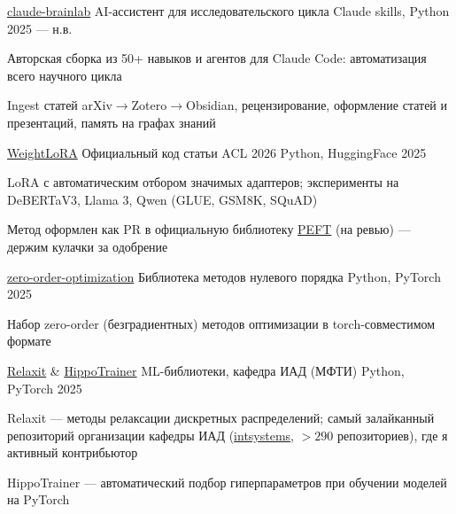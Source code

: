 \begin{cventries}
  \cventry
    {\href{https://github.com/Vepricov/claude-brainlab}{claude-brainlab}} %
    {AI-ассистент для исследовательского цикла} %
    {Claude skills, Python} %
    {2025 — н.в.} %
    {
      \begin{cvitems}
        \item {Авторская сборка из 50+ навыков и агентов для Claude Code: автоматизация всего научного цикла}
        \item {Ingest статей arXiv$\rightarrow$Zotero$\rightarrow$Obsidian, рецензирование, оформление статей и презентаций, память на графах знаний}
      \end{cvitems}
    }

  \cventry
    {\href{https://github.com/Vepricov/WLoRA}{WeightLoRA}} %
    {Официальный код статьи ACL 2026} %
    {Python, HuggingFace} %
    {2025} %
    {
      \begin{cvitems}
        \item {LoRA с автоматическим отбором значимых адаптеров; эксперименты на DeBERTaV3, Llama 3, Qwen (GLUE, GSM8K, SQuAD)}
        \item {Метод оформлен как PR в официальную библиотеку \href{https://github.com/huggingface/peft}{PEFT} (на ревью) — держим кулачки за одобрение}
      \end{cvitems}
    }

  \cventry
    {\href{https://github.com/Vepricov/zero-order-optimization}{zero-order-optimization}} %
    {Библиотека методов нулевого порядка} %
    {Python, PyTorch} %
    {2025} %
    {
      \begin{cvitems}
        \item {Набор zero-order (безградиентных) методов оптимизации в torch-совместимом формате}
      \end{cvitems}
    }

  \cventry
    {\href{https://github.com/intsystems/relaxit}{Relaxit} \& \href{https://github.com/intsystems/hippotrainer}{HippoTrainer}} %
    {ML-библиотеки, кафедра ИАД (МФТИ)} %
    {Python, PyTorch} %
    {2025} %
    {
      \begin{cvitems}
        \item {Relaxit — методы релаксации дискретных распределений; самый залайканный репозиторий организации кафедры ИАД (\href{https://github.com/intsystems}{intsystems}, $>290$ репозиториев), где я активный контрибьютор}
        \item {HippoTrainer — автоматический подбор гиперпараметров при обучении моделей на PyTorch}
      \end{cvitems}
    }


\end{cventries}
